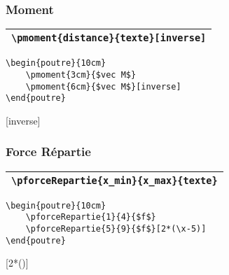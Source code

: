 \documentclass[a4paper,10pt]{article}
\begin{document}
	
	  
            \subsubsection{Moment}

            \begin{center}
                \begin{tabular}{|l|}
                    \hline
                    \verb!\pmoment{distance}{texte}[inverse]!
                    \\\hline
                \end{tabular}
            \end{center}
        
           \begin{verbatim}
\begin{poutre}{10cm}
    \pmoment{3cm}{$vec M$}
    \pmoment{6cm}{$vec M$}[inverse]
\end{poutre}
        \end{verbatim}
	
\begin{poutre}{10cm}
    [inverse]
\end{poutre}


	  
            \subsubsection{Force Répartie}

            \begin{center}
                \begin{tabular}{|l|}
                    \hline
                    \verb!\pforceRepartie{x_min}{x_max}{texte}!
                    \\\hline
                \end{tabular}
            \end{center}
        
           \begin{verbatim}
\begin{poutre}{10cm}
    \pforceRepartie{1}{4}{$f$}
    \pforceRepartie{5}{9}{$f$}[2*(\x-5)]
\end{poutre}
        \end{verbatim}
	
\begin{poutre}{10cm}
    [2*()]
\end{poutre}
\end{document}
